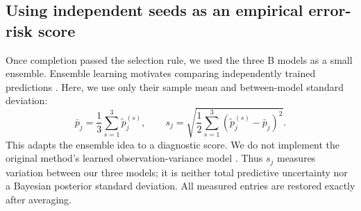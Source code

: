 \documentclass[11pt,a4paper]{article}
\begin{document}
\newpage
\subsection{Using independent seeds as an empirical error-risk score}
Once completion passed the selection rule, we used the three B models as a small ensemble. Ensemble learning motivates comparing independently trained predictions \cite{ensembles}. Here, we use only their sample mean and between-model standard deviation:
\begin{equation}
\bar p_j=\frac13\sum_{s=1}^{3}\widetilde p^{(s)}_j,\qquad
s_j=\sqrt{\frac12\sum_{s=1}^{3}(\widetilde p^{(s)}_j-\bar p_j)^2}.\label{eq:ensemble}
\end{equation}
This adapts the ensemble idea to a diagnostic score. We do not implement the original method's learned observation-variance model \cite{ensembles}. Thus $s_j$ measures variation between our three models; it is neither total predictive uncertainty nor a Bayesian posterior standard deviation. All measured entries are restored exactly after averaging.
\end{document}
